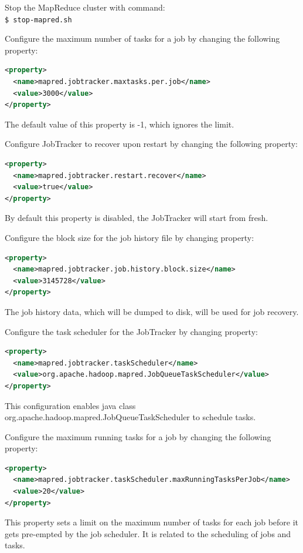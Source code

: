 Stop the MapReduce cluster with command:\\
\verb|$ stop-mapred.sh|

Configure the maximum number of tasks for a job by changing the following property:
\lstset{style=bashstyle}
\begin{lstlisting}[language=XML]
<property>
  <name>mapred.jobtracker.maxtasks.per.job</name>
  <value>3000</value>
</property>
\end{lstlisting}
The default value of this property is -1, which ignores the limit.

Configure JobTracker to recover upon restart by changing the following property:
\lstset{style=bashstyle}
\begin{lstlisting}[language=XML]
<property>
  <name>mapred.jobtracker.restart.recover</name>
  <value>true</value>
</property>
\end{lstlisting}
By default this property is disabled, the JobTracker will start from fresh.

Configure the block size for the job history file by changing property:
\lstset{style=bashstyle}
\begin{lstlisting}[language=XML]
<property>
  <name>mapred.jobtracker.job.history.block.size</name>
  <value>3145728</value>
</property>
\end{lstlisting}

The job history data, which will be dumped to disk, will be used for job recovery.

Configure the task scheduler for the JobTracker by changing property:
\lstset{style=bashstyle}
\begin{lstlisting}[language=XML]
<property>
  <name>mapred.jobtracker.taskScheduler</name>
  <value>org.apache.hadoop.mapred.JobQueueTaskScheduler</value>
</property>
\end{lstlisting}
This configuration enables java class org.apache.hadoop.mapred.JobQueueTaskScheduler to schedule tasks.


Configure the maximum running tasks for a job by changing the following property:
\lstset{style=bashstyle}
\begin{lstlisting}[language=XML]
<property>
  <name>mapred.jobtracker.taskScheduler.maxRunningTasksPerJob</name>
  <value>20</value>
</property>
\end{lstlisting}

This property sets a limit on the maximum number of tasks for each job before it gets pre-empted by the job scheduler. It is related to the scheduling of jobs and tasks.


